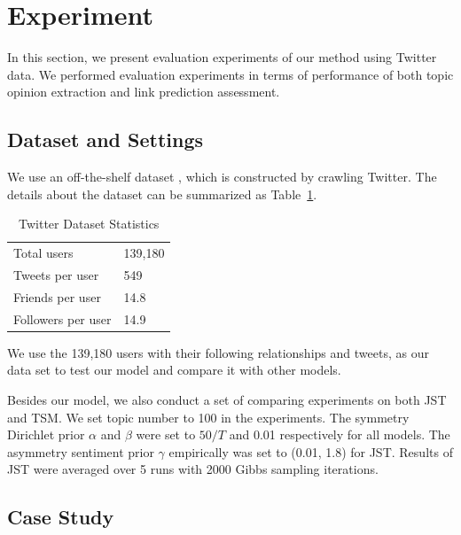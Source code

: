 \documentclass[runningheads,a4paper]{llncs}
\begin{document}
\section{Experiment}
\label{sec5}

In this section, we present evaluation experiments of our method using Twitter data. We performed evaluation experiments in terms of performance of both topic opinion extraction and link prediction assessment. 

\subsection{Dataset and Settings}

We use an off-the-shelf dataset \cite{DBLP:conf/kdd/LiWDWC12}, which is constructed by crawling Twitter. The details about the dataset can be summarized as Table~\ref{tab1}.   
\begin{table}
\centering
\caption{Twitter Dataset Statistics}
\label{tab1}
\begin{tabular}{ll}
\hline
Total users  & 139,180 \\
Tweets per user & 549 \\
Friends per user & 14.8 \\
Followers per user & 14.9  \\
\hline
\end{tabular}
\end{table}
We use the 139,180 users with their following relationships and tweets, as our data set to test our model and compare it with other models.

Besides our model, we also conduct a set of comparing experiments on both JST and TSM.  We set topic number to 100 in the experiments. The symmetry Dirichlet prior $ \alpha $ and $ \beta $ were set to $ 50/T $ and 0.01 respectively for all models. The asymmetry sentiment prior $ \gamma $ empirically was set to (0.01, 1.8) for JST. Results of JST were averaged over 5 runs with 2000 Gibbs sampling iterations.

\subsection{Case Study}
\end{document}
